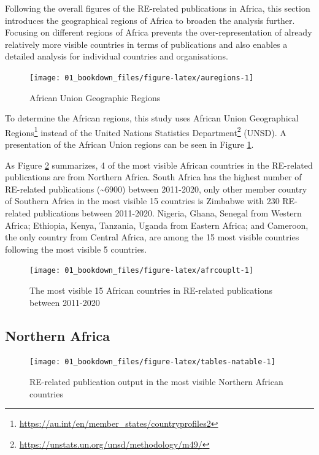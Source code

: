 \documentclass[
]{book}
\renewcommand{\href}[2]{#2\footnote{\url{#1}}}
\begin{document}
Following the overall figures of the RE-related publications in Africa, this section introduces the geographical regions of Africa to broaden the analysis further. Focusing on different regions of Africa prevents the over-representation of already relatively more visible countries in terms of publications and also enables a detailed analysis for individual countries and organisations.

\begin{figure}
\texttt{[image: 01\_bookdown\_files/figure-latex/auregions-1]} \caption{African Union Geographic Regions}\label{fig:auregions}
\end{figure}

To determine the African regions, this study uses \href{https://au.int/en/member_states/countryprofiles2}{African Union Geographical Regions} instead of the \href{https://unstats.un.org/unsd/methodology/m49/}{United Nations Statistics Department} (UNSD). A presentation of the African Union regions can be seen in Figure \ref{fig:auregions}.

As Figure \ref{fig:afrcouplt} summarizes, 4 of the most visible African countries in the RE-related publications are from Northern Africa. South Africa has the highest number of RE-related publications (\textasciitilde6900) between 2011-2020, only other member country of Southern Africa in the most visible 15 countries is Zimbabwe with 230 RE-related publications between 2011-2020. Nigeria, Ghana, Senegal from Western Africa; Ethiopia, Kenya, Tanzania, Uganda from Eastern Africa; and Cameroon, the only country from Central Africa, are among the 15 most visible countries following the most visible 5 countries.

\begin{figure}
\texttt{[image: 01\_bookdown\_files/figure-latex/afrcouplt-1]} \caption{The most visible 15 African countries in  RE-related publications between 2011-2020}\label{fig:afrcouplt}
\end{figure}

\hypertarget{northern-africa}{%
\subsection{Northern Africa}\label{northern-africa}}

\begin{figure}
\texttt{[image: 01\_bookdown\_files/figure-latex/tables-natable-1]} \caption{RE-related publication output in the most visible Northern African countries}\label{fig:tables-natable}
\end{figure}
\end{document}
